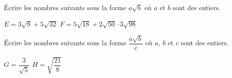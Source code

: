 \documentclass[french,12pt]{report}
\begin{document}
\begin{Exercice}
Écrire les nombres suivants sous la forme $a\sqrt{b}$ où $a$ et $b$ sont des entiers.\par 
$E = 3\sqrt{8} + 5\sqrt{32}$  \hspace{3cm} $F = 5\sqrt{18} + 2\sqrt{50} – 3\sqrt{98}$


\end{Exercice}

\begin{Exercice}
Écrire les nombres suivants sous la forme $\dfrac{a\sqrt{b}}{c}$ où $a$, $b$ et $c$ sont des entiers.\par 
$G = \dfrac{3}{\sqrt{5}}$ \hspace{4.3cm} $H= \sqrt{\dfrac{21}{8}}$
\end{Exercice}
\end{document}
